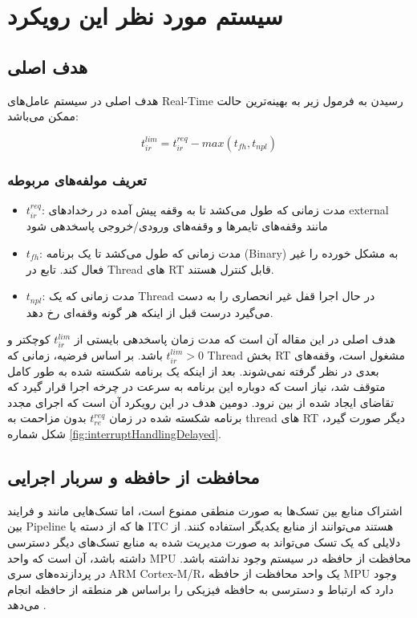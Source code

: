 \documentclass[10pt, a4paper]{article}
\begin{document}
\section{سیستم مورد نظر این رویکرد}

\subsection{هدف اصلی}

هدف اصلی در سیستم عامل‌های Real-Time رسیدن به فرمول زیر به بهینه‌ترین حالت ممکن می‌باشد:

\begin{equation}
    t^{lim}_{ir} = t^{req}_{ir} - max(t_{fh}, t_{npl})
\end{equation}

\subsubsection{تعریف مولفه‌های مربوطه}

\begin{itemize}
    \item $t^{req}_{ir}$: مدت زمانی که طول می‌کشد تا به وقفه پیش آمده در
    رخداد‌های external مانند وقفه‌های تایمرها و وقفه‌های ورودی/خروجی پاسخدهی شود
    \item $t_{fh}$: مدت زمانی که طول می‌کشد تا  یک برنامه
    (Binary) به مشکل خورده را غیر فعال کند. تابع  در Thread
    های RT قابل کنترل هستند.
    \item $t_{npl}$: مدت زمانی که یک Thread در حال اجرا قفل غیر انحصاری را به
    دست می‌گیرد درست قبل از اینکه هر گونه وقفه‌ای رخ دهد.
\end{itemize}


هدف اصلی در این مقاله آن است که مدت زمان پاسخدهی بایستی از $t^{lim}_{ir}$ کوچکتر
و $t^{lim}_{ir} > 0$ باشد. بر اساس فرضیه، زمانی که Thread بخش RT مشغول است،
وقفه‌های بعدی در نظر گرفته نمی‌شوند. بعد از اینکه یک برنامه شکسته شده به طور
کامل متوقف شد، نیاز است که دوباره این برنامه به سرعت در چرخه اجرا قرار گیرد که
تقاضای ایجاد شده از بین نرود. دومین هدف در این رویکرد آن است که اجرای مجدد
برنامه شکسته شده در زمان $t^{req}_{re}$ بدون مزاحمت به thread های RT دیگر صورت
گیرد، شکل شماره \ref{fig:interruptHandlingDelayed}.

\subsection{محافظت از حافظه و سربار اجرایی}

اشتراک منابع بین تسک‌ها به صورت منطقی ممنوع است، اما تسک‌هایی مانند  و فرایند بین Pipeline ها که از دسته  یا ITC
هستند می‌توانند از منابع یکدیگر استفاده کنند. از دلایلی که یک تسک می‌تواند به
صورت مدیریت شده به منابع تسک‌های دیگر دسترسی داشته باشد، آن است که واحد MPU
محافظت از حافظه در سیستم وجود نداشته باشد. در پردازنده‌های سری ARM Cortex-M/R،
یک واحد محافظت از حافظه MPU وجود دارد که ارتباط و دسترسی به حافظه فیزیکی را
براساس هر منطقه از حافظه انجام می‌دهد \cite{cortexm4arm}.
\end{document}
